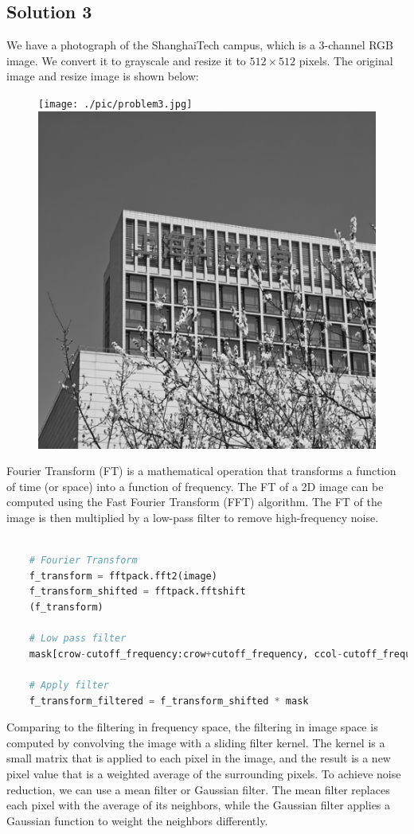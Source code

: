 \documentclass[12pt, a4paper, oneside]{ctexart}
\begin{document}
\subsection*{Solution 3}

We have a photograph of the ShanghaiTech campus, which is a 3-channel RGB image. We convert it to grayscale and resize it to $512\times
512$ pixels. The original image and resize  image is shown below:


\begin{figure}[h]
	\centering
	\texttt{[image: ./pic/problem3.jpg]}
	\includegraphics[width=.39\textwidth]{./result/original_image.png}

\end{figure}

\begin{figure}[h]
	\centering

\end{figure}
Fourier Transform (FT) is a mathematical operation that transforms a function of time (or space) into a function of frequency. The FT of a 2D image can be computed using the Fast Fourier Transform (FFT) algorithm. The FT of the image is then multiplied by a low-pass filter to remove high-frequency noise. 

\begin{lstlisting}[style=mystyle,language=Python]

	# Fourier Transform
    f_transform = fftpack.fft2(image)
    f_transform_shifted = fftpack.fftshift
	(f_transform)

	# Low pass filter
    mask[crow-cutoff_frequency:crow+cutoff_frequency, ccol-cutoff_frequency:ccol+cutoff_frequency] = 1

	# Apply filter
	f_transform_filtered = f_transform_shifted * mask
\end{lstlisting}

Comparing to the filtering in frequency space, the filtering in image space is computed by convolving the image with a sliding filter kernel. The kernel is a small matrix that is applied to each pixel in the image, and the result is a new pixel value that is a weighted average of the surrounding pixels. To achieve noise reduction, we can use a mean filter or Gaussian filter. The mean filter replaces each pixel with the average of its neighbors, while the Gaussian filter applies a Gaussian function to weight the neighbors differently.
\end{document}
